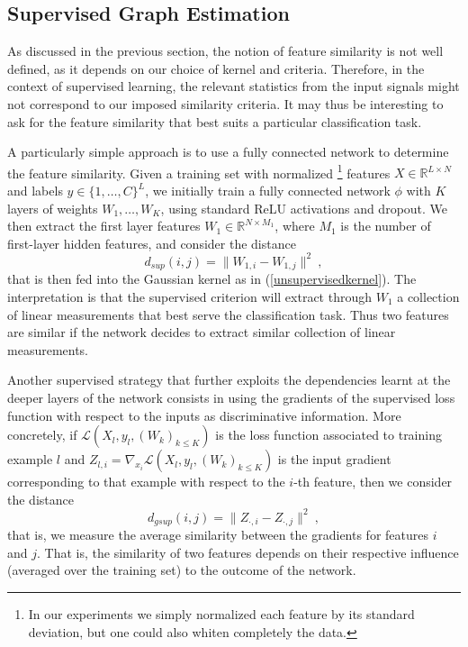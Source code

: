 \documentclass{article} %
\begin{document}

\subsection{ Supervised Graph Estimation }

As discussed in the previous section, the notion of feature similarity is not well defined, as it depends on our choice of 
kernel and criteria. Therefore, in the context of supervised learning, the relevant statistics from the input signals might not correspond to 
our imposed similarity criteria. It may thus be interesting to ask for the feature similarity that best suits a particular classification task. 

A particularly simple approach is to use a fully connected network to determine the feature similarity. Given a training set with normalized \footnote{In our experiments we simply normalized each feature by its standard deviation, but one could also whiten completely the data.} features $X \in \mathbb{R}^{L \times N}$ 
and labels $y \in \{1,\dots,C\}^L$, we initially train a fully connected network $\phi$ with $K$ layers of weights $W_1, \dots, W_K$, using standard ReLU activations and dropout. We then extract the first layer features $W_1 \in \mathbb{R}^{N \times M_1}$, where $M_1$ is the number of first-layer hidden features, and consider the distance
\begin{equation}
\label{supervisedkernel}
d_{sup}(i, j) = \| W_{1,i} - W_{1,j} \|^2~,
\end{equation}
that is then fed into the Gaussian kernel as in (\ref{unsupervisedkernel}). The interpretation is that the supervised criterion will extract through $W_1$ a collection of linear measurements that best serve the classification task. Thus two features are similar if the network decides to extract similar collection of linear measurements.  

Another supervised strategy that further exploits the dependencies learnt at the deeper layers of the network consists in using the gradients of the supervised loss function with respect to the inputs as discriminative information. More concretely, if $\mathcal{L}(X_l, y_l, (W_k)_{k \leq K})$ is the loss function associated to training example $l$ and $Z_{l,i} = \nabla_{x_i} \mathcal{L}(X_l, y_l, (W_k)_{k \leq K})$ is the input gradient corresponding to that example with respect to the $i$-th feature, then we consider the distance 
\begin{equation}
\label{supervisedkernel2}
d_{gsup}(i, j) = \| Z_{\cdot, i} - Z_{\cdot, j} \|^2~,
\end{equation}
that is, we measure the average similarity between the gradients for features $i$ and $j$. That is, the similarity of two features depends on their respective influence (averaged over the training set) to the outcome of the network. 
\end{document}
